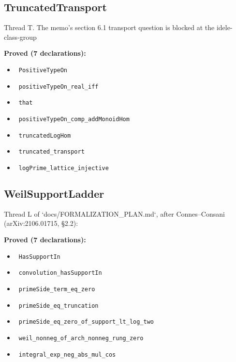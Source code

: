 \documentclass{report}
\theoremstyle{definition}
\begin{document}
\subsection{TruncatedTransport}
Thread T. The memo's section 6.1 transport question is blocked at the idele-class-group

\noindent\textbf{Proved (7 declarations):}
\begin{itemize}
  \item {}\leanok\ \texttt{PositiveTypeOn}
  \item {}\leanok\ \texttt{positiveTypeOn\_real\_iff}
  \item {}\leanok\ \texttt{that}
  \item {}\leanok\ \texttt{positiveTypeOn\_comp\_addMonoidHom}
  \item {}\leanok\ \texttt{truncatedLogHom}
  \item {}\leanok\ \texttt{truncated\_transport}
  \item {}\leanok\ \texttt{logPrime\_lattice\_injective}
\end{itemize}

\subsection{WeilSupportLadder}
Thread L of `docs/FORMALIZATION\_PLAN.md`, after Connes–Consani (arXiv:2106.01715, §2.2):

\noindent\textbf{Proved (7 declarations):}
\begin{itemize}
  \item {}\leanok\ \texttt{HasSupportIn}
  \item {}\leanok\ \texttt{convolution\_hasSupportIn}
  \item {}\leanok\ \texttt{primeSide\_term\_eq\_zero}
  \item {}\leanok\ \texttt{primeSide\_eq\_truncation}
  \item {}\leanok\ \texttt{primeSide\_eq\_zero\_of\_support\_lt\_log\_two}
  \item {}\leanok\ \texttt{weil\_nonneg\_of\_arch\_nonneg\_rung\_zero}
  \item {}\leanok\ \texttt{integral\_exp\_neg\_abs\_mul\_cos}
\end{itemize}
\end{document}
